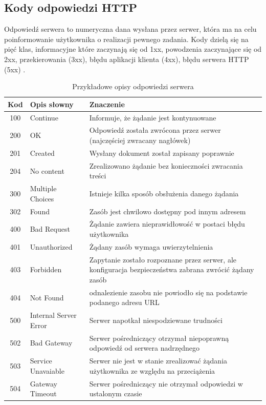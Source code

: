 \subsection*{Kody odpowiedzi HTTP}
Odpowiedź serwera to numeryczna dana wysłana przez serwer, która ma na celu poinformowanie użytkownika o realizacji pewnego zadania. Kody dzielą się na pięć klas, informacyjne które zaczynają się od 1xx, powodzenia zaczynające się od 2xx, przekierowania (3xx), błędu aplikacji klienta (4xx), błędu serwera HTTP (5xx) \cite{TempWiki}.
\begin{longtable}{|c|p{2.1cm}|p{9.9cm}|}
	\caption{Przykładowe opisy odpowiedzi serwera} 
	\label{tab:Kody-HTTP} \\
	\hline
	\textbf{Kod} & \textbf{Opis słowny} & \textbf{Znaczenie} \\ \hline
	100 & Continue & Informuje, że żądanie jest kontynuowane \\ \hline
	200 & OK & Odpowiedź została zwrócona przez serwer (najczęściej zwracany nagłówek)\\ \hline
	201 & Created & Wysłany dokument został zapisany poprawnie \\ \hline
	204 & No content & Zrealizowano żądanie bez konieczności zwracania treści \\ \hline
	300 & Multiple Choices & Istnieje kilka sposób obsłużenia danego żądania \\ \hline
	302 & Found & Zasób jest chwilowo dostępny pod innym adresem \\ \hline
	400 & Bad Request & Żądanie zawiera nieprawidłowość w postaci błędu użytkownika \\ \hline
	401 & Unauthorized & Żądany zasób wymaga uwierzytelnienia \\ \hline
	403 & Forbidden & Zapytanie zostało rozpoznane przez serwer, ale konfiguracja bezpieczeństwa zabrana zwrócić żądany zasób \\ \hline
	404 & Not Found & odnalezienie zasobu nie powiodło się na podstawie podanego adresu URL\\ \hline
	500 & Internal Server Error & Serwer napotkał niespodziewane trudności \\ \hline
	502 & Bad Gateway & Serwer pośredniczący otrzymał niepoprawną odpowiedź od serwera nadrzędnego \\ \hline
	503 & Service Unavaiable & Serwer nie jest w stanie zrealizować żądania użytkownika ze względu na przeciążenia \\ \hline
	504 & Gateway Timeout & Serwer pośredniczący nie otrzymał odpowiedzi w ustalonym czasie \\ \hline
\end{longtable}


